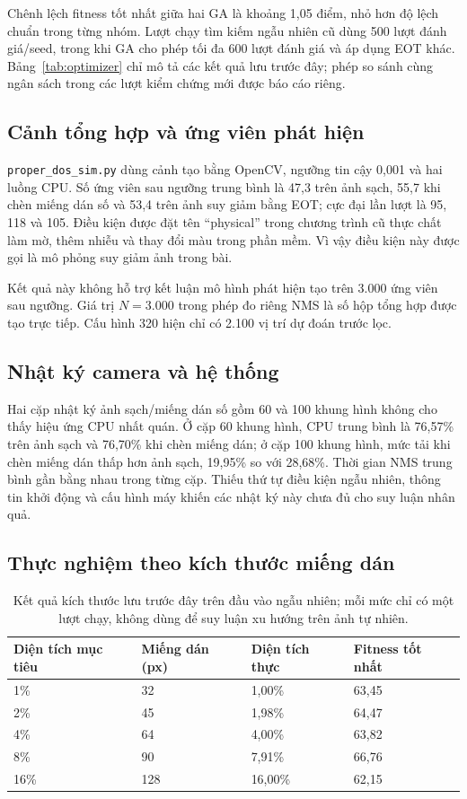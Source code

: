 \documentclass[a4paper,fleqn]{cas-dc}
\begin{document}
Chênh lệch fitness tốt nhất giữa hai GA là khoảng 1,05 điểm, nhỏ hơn độ lệch chuẩn trong từng nhóm. Lượt chạy tìm kiếm ngẫu nhiên cũ dùng 500 lượt đánh giá/seed, trong khi GA cho phép tối đa 600 lượt đánh giá và áp dụng EOT khác. Bảng~\ref{tab:optimizer} chỉ mô tả các kết quả lưu trước đây; phép so sánh cùng ngân sách trong các lượt kiểm chứng mới được báo cáo riêng.

\subsection{Cảnh tổng hợp và ứng viên phát hiện}

\texttt{proper\_dos\_sim.py} dùng cảnh tạo bằng OpenCV, ngưỡng tin cậy 0,001 và hai luồng CPU. Số ứng viên sau ngưỡng trung bình là 47,3 trên ảnh sạch, 55,7 khi chèn miếng dán số và 53,4 trên ảnh suy giảm bằng EOT; cực đại lần lượt là 95, 118 và 105. Điều kiện được đặt tên “physical” trong chương trình cũ thực chất làm mờ, thêm nhiễu và thay đổi màu trong phần mềm. Vì vậy điều kiện này được gọi là mô phỏng suy giảm ảnh trong bài.

Kết quả này không hỗ trợ kết luận mô hình phát hiện tạo trên 3.000 ứng viên sau ngưỡng. Giá trị $N=3.000$ trong phép đo riêng NMS là số hộp tổng hợp được tạo trực tiếp. Cấu hình 320 hiện chỉ có 2.100 vị trí dự đoán trước lọc.

\subsection{Nhật ký camera và hệ thống}

Hai cặp nhật ký ảnh sạch/miếng dán số gồm 60 và 100 khung hình không cho thấy hiệu ứng CPU nhất quán. Ở cặp 60 khung hình, CPU trung bình là 76,57\% trên ảnh sạch và 76,70\% khi chèn miếng dán; ở cặp 100 khung hình, mức tải khi chèn miếng dán thấp hơn ảnh sạch, 19,95\% so với 28,68\%. Thời gian NMS trung bình gần bằng nhau trong từng cặp. Thiếu thứ tự điều kiện ngẫu nhiên, thông tin khởi động và cấu hình máy khiến các nhật ký này chưa đủ cho suy luận nhân quả.

\subsection{Thực nghiệm theo kích thước miếng dán}

\begin{table}[t]
\centering
\caption{Kết quả kích thước lưu trước đây trên đầu vào ngẫu nhiên; mỗi mức chỉ có một lượt chạy, không dùng để suy luận xu hướng trên ảnh tự nhiên.}
\begin{tabularx}{\textwidth}{XXXX}
\toprule
Diện tích mục tiêu & Miếng dán (px) & Diện tích thực & Fitness tốt nhất \\
\midrule
1\% & 32 & 1,00\% & 63,45 \\
2\% & 45 & 1,98\% & 64,47 \\
4\% & 64 & 4,00\% & 63,82 \\
8\% & 90 & 7,91\% & 66,76 \\
16\% & 128 & 16,00\% & 62,15 \\
\bottomrule
\end{tabularx}
\label{tab:patch_area}
\end{table}
\end{document}
